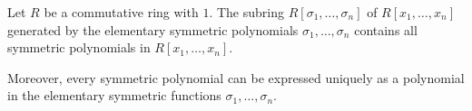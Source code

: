 Let $R$ be a commutative ring with $1$. The subring $R[\sigma_1, \ldots, \sigma_n]$ of $R[x_1, \ldots, x_n]$ generated by the elementary symmetric polynomials $\sigma_1, \ldots, \sigma_n$ contains all symmetric polynomials in $R[x_1, \ldots, x_n]$.

Moreover, every symmetric polynomial can be expressed uniquely as a polynomial in the elementary symmetric functions $\sigma_1, \ldots, \sigma_n$.

